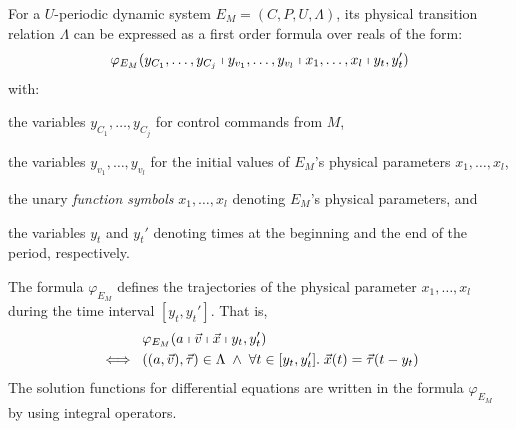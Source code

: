 \documentclass{sig-alternate}
\begin{document}
For a $U$-periodic dynamic system
$E_M = (C, P, U, \Lambda)$,
its physical transition relation
$\Lambda$ can be expressed as a first order formula
over reals of the form:
\[
\varphi_{E_M}(
y_{C_1},\ldots,y_{C_j}\shortmid
y_{v_1}, \ldots, y_{v_l}\shortmid
x_1, \ldots, x_l\shortmid
y_t, y_t'
)
\]
with:
\begin{inparaenum}[(i)]
	\item the variables $y_{C_1},\ldots,y_{C_j}$  for control commands  from $M$,
	\item the variables $y_{v_1}, \ldots, y_{v_l}$  for the initial values 
	of $E_M$'s physical parameters $x_1, \ldots, x_l$, 
	\item the unary \emph{function symbols} $x_1, \ldots, x_l$
	denoting $E_M$'s physical parameters,
	and
	\item  the variables $y_t$ and $y_t'$ denoting times 
	at the beginning and the end of the period, respectively.
\end{inparaenum}
%
The formula $\varphi_{E_M}$ defines 
the trajectories of the physical parameter $x_1, \ldots, x_l$ %
during the time interval  $[y_t, y_t']$. 
That is,
\begin{equation}
\begin{aligned}
&
\varphi_{E_M}(a\shortmid \vec{v}\shortmid \vec{x}\shortmid y_t, y_t')
\\
\iff\;\;
&
((a, \vec{v}),  \vec{\tau}) \in \Lambda
\;\wedge\;
\forall t \in [y_t, y_t'].\; \vec{x}(t) = \vec{\tau}(t - y_t)
\end{aligned}
\label{eq:formula-rel-env}
\end{equation}
The solution functions for differential equations
are written in the formula $\varphi_{E_M}$
by using integral operators.
\end{document}
